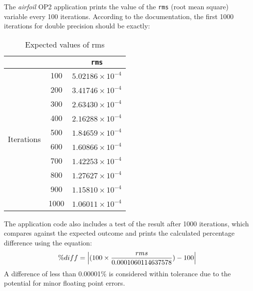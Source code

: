 The \textit{airfoil} OP2 application prints the value of the \verb|rms| (root mean square) variable every 100 iterations. According to the documentation, the first 1000 iterations for double precision should be exactly:\\
\begin{table}[h!]
\vspace{-2em}
\centering
\renewcommand{\arraystretch}{1.2}
\begin{tabular}{c c || c }
& & \verb|rms| \\
\hline
\multirow{10}{*}{Iterations} & 100 & $ 5.02186\times10^{-4} $ \\
& 200 & $ 3.41746\times10^{-4} $ \\
& 300 & $ 2.63430\times10^{-4} $ \\
& 400 & $ 2.16288\times10^{-4} $ \\
& 500 & $ 1.84659\times10^{-4} $ \\
& 600 & $ 1.60866\times10^{-4} $ \\
& 700 & $ 1.42253\times10^{-4} $ \\
& 800 & $ 1.27627\times10^{-4} $ \\
& 900 & $ 1.15810\times10^{-4} $ \\
& 1000 & $ 1.06011\times10^{-4} $
\end{tabular}
\caption{Expected values of rms}
\label{tab:expected}

\end{table}

\noindent The application code also includes a test of the result after 1000 iterations, which compares against the expected outcome and prints the calculated percentage difference using the equation:
\[\%diff = \abs{ (100 \times \frac{rms}{0.0001060114637578}) - 100 }\]
A difference of less than 0.00001\% is considered within tolerance due to the potential for minor floating point errors.
\clearpage
{}

